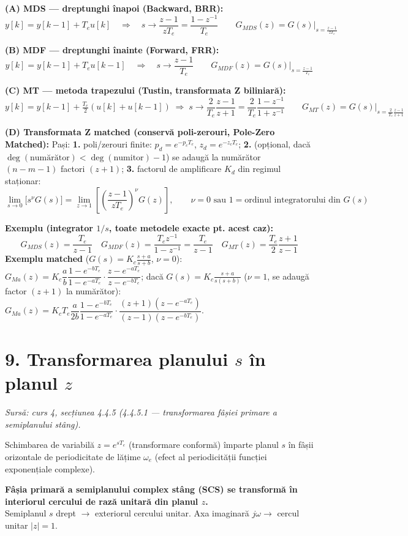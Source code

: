 \documentclass[10pt,a4paper]{article}
\newcommand{\srcnote}[1]{{\footnotesize\color{gray!55!black}\textit{Sursă: #1}}\par}
\begin{document}
\begin{methodbox}
\textbf{(A) MDS — dreptunghi înapoi (Backward, BRR):}
$$y[k]=y[k-1]+T_eu[k] \quad\Rightarrow\quad s\to\dfrac{z-1}{zT_e}=\dfrac{1-z^{-1}}{T_e}\qquad G_{MDS}(z)=G(s)\big|_{s=\frac{z-1}{zT_e}}$$

\textbf{(B) MDF — dreptunghi înainte (Forward, FRR):}
$$y[k]=y[k-1]+T_eu[k-1] \quad\Rightarrow\quad s\to\dfrac{z-1}{T_e}\qquad G_{MDF}(z)=G(s)\big|_{s=\frac{z-1}{T_e}}$$

\textbf{(C) MT — metoda trapezului (Tustin, transformata Z biliniară):}
$$y[k]=y[k-1]+\tfrac{T_e}{2}(u[k]+u[k-1]) \;\Rightarrow\; s\to\dfrac{2}{T_e}\dfrac{z-1}{z+1}=\dfrac{2}{T_e}\dfrac{1-z^{-1}}{1+z^{-1}}\qquad G_{MT}(z)=G(s)\big|_{s=\frac{2}{T_e}\frac{z-1}{z+1}}$$

\textbf{(D) Transformata Z matched (conservă poli-zerouri, Pole-Zero Matched):}
Pași: \textbf{1.} poli/zerouri finite: $p_d=e^{-p_cT_e}$, $z_d=e^{-z_cT_e}$; \textbf{2.} (opțional, dacă $\deg(\text{numărător})<\deg(\text{numitor})-1$) se adaugă la numărător $(n{-}m{-}1)$ factori $(z+1)$; \textbf{3.} factorul de amplificare $K_d$ din regimul staționar:
$$\lim_{s\to0}\big[s^{\nu}G(s)\big]=\lim_{z\to1}\left[\left(\dfrac{z-1}{zT_e}\right)^{\!\nu}\! G(z)\right],\qquad \nu=0\text{ sau }1=\text{ordinul integratorului din }G(s)$$
\end{methodbox}

\textbf{Exemplu (integrator $1/s$, toate metodele exacte pt. acest caz):}
$$G_{MDS}(z)=\dfrac{T_e}{z-1}\quad G_{MDF}(z)=\dfrac{T_ez^{-1}}{1-z^{-1}}=\dfrac{T_e}{z-1}\quad G_{MT}(z)=\dfrac{T_e}{2}\dfrac{z+1}{z-1}$$
\textbf{Exemplu matched} ($G(s)=K_c\frac{s+a}{s+b}$, $\nu{=}0$): $G_{Ma}(z)=K_c\dfrac{a}{b}\dfrac{1-e^{-bT_e}}{1-e^{-aT_e}}\cdot\dfrac{z-e^{-aT_e}}{z-e^{-bT_e}}$; dacă $G(s)=K_c\frac{s+a}{s(s+b)}$ ($\nu{=}1$, se adaugă factor $(z+1)$ la numărător): $G_{Ma}(z)=K_cT_e\dfrac{a}{2b}\dfrac{1-e^{-bT_e}}{1-e^{-aT_e}}\cdot\dfrac{(z+1)(z-e^{-aT_e})}{(z-1)(z-e^{-bT_e})}$.

\section*{9. Transformarea planului $s$ în planul $z$}\label{sec:9}
\srcnote{curs 4, secțiunea 4.4.5 (4.4.5.1 — transformarea fâșiei primare a semiplanului stâng).}
Schimbarea de variabilă $z=e^{sT_e}$ (transformare conformă) împarte planul $s$ în fâșii orizontale de periodicitate de lățime $\omega_e$ (efect al periodicității funcției exponențiale complexe).
\begin{keyeq}\color{red!65!black}
\textbf{Fâșia primară a semiplanului complex stâng (SCS) se transformă în interiorul cercului de rază unitară din planul $z$.}\\
Semiplanul $s$ drept $\to$ exteriorul cercului unitar. Axa imaginară $j\omega\to$ cercul unitar $|z|{=}1$.
\end{keyeq}
\end{document}
